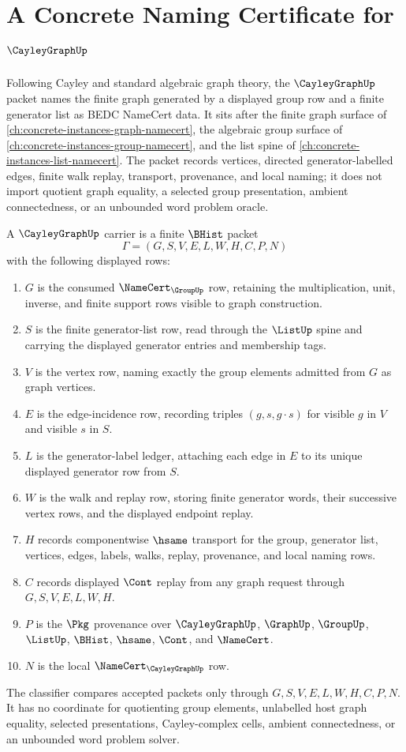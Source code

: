 \chapter{A Concrete Naming Certificate for $\CayleyGraphUp$}
\label{ch:concrete-instances-cayley-graph-namecert}

Following Cayley and standard algebraic graph theory, the $\CayleyGraphUp$ packet names the finite graph generated by a displayed group row and a finite generator list as BEDC NameCert data. It sits after the finite graph surface of \autoref{ch:concrete-instances-graph-namecert}, the algebraic group surface of \autoref{ch:concrete-instances-group-namecert}, and the list spine of \autoref{ch:concrete-instances-list-namecert}. The packet records vertices, directed generator-labelled edges, finite walk replay, transport, provenance, and local naming; it does not import quotient graph equality, a selected group presentation, ambient connectedness, or an unbounded word problem oracle.

\begin{definition}
\label{def:cayley-graph-carrier}
A $\CayleyGraphUp$ carrier is a finite $\BHist$ packet
$$
\Gamma=(G,S,V,E,L,W,H,C,P,N)
$$
with the following displayed rows:
\begin{enumerate}
\item $G$ is the consumed $\NameCert_{\GroupUp}$ row, retaining the multiplication, unit, inverse, and finite support rows visible to graph construction.
\item $S$ is the finite generator-list row, read through the $\ListUp$ spine and carrying the displayed generator entries and membership tags.
\item $V$ is the vertex row, naming exactly the group elements admitted from $G$ as graph vertices.
\item $E$ is the edge-incidence row, recording triples $(g,s,g\cdot s)$ for visible $g$ in $V$ and visible $s$ in $S$.
\item $L$ is the generator-label ledger, attaching each edge in $E$ to its unique displayed generator row from $S$.
\item $W$ is the walk and replay row, storing finite generator words, their successive vertex rows, and the displayed endpoint replay.
\item $H$ records componentwise $\hsame$ transport for the group, generator list, vertices, edges, labels, walks, replay, provenance, and local naming rows.
\item $C$ records displayed $\Cont$ replay from any graph request through $G,S,V,E,L,W,H$.
\item $P$ is the $\Pkg$ provenance over $\CayleyGraphUp$, $\GraphUp$, $\GroupUp$, $\ListUp$, $\BHist$, $\hsame$, $\Cont$, and $\NameCert$.
\item $N$ is the local $\NameCert_{\CayleyGraphUp}$ row.
\end{enumerate}
The classifier compares accepted packets only through $G,S,V,E,L,W,H,C,P,N$. It has no coordinate for quotienting group elements, unlabelled host graph equality, selected presentations, Cayley-complex cells, ambient connectedness, or an unbounded word problem solver.
\end{definition}

